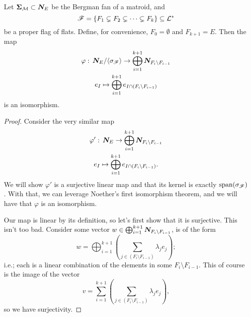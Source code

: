 \documentclass[12pt,oneside]{../../sfsuthesis}
\begin{document}
\begin{proposition}\th\label{thm:quotientBijection}
    Let \( \bm{\Sigma}_{\mathcal{M}} \subset \bm{N}_E \) be the Bergman fan of a matroid, and
    \[
        \mathscr{F} = \{ F_1 \subsetneq F_2 \subsetneq \cdots \subsetneq F_k \} \subseteq \mathcal{L}^\ast
    \]
    be a proper flag of flats.
    Define, for convenience, \( F_0 = \emptyset \) and \( F_{k+1} = E \).
    Then the map
    \begin{gather*}
        \varphi:\, \bm{N}_E/\langle \sigma_{\mathscr{F}} \rangle \to \bigoplus_{i=1}^{k+1} \bm{N}_{F_i \setminus F_{i-1}} \\
        e_I \mapsto \bigoplus_{i=1}^{k+1} e_{I \cap (F_i \setminus F_{i-1})}
    \end{gather*}
    is an isomorphism.
\end{proposition}
\begin{proof}
    Consider the very similar map
    \begin{gather*}
        \varphi':\, \bm{N}_E \to \bigoplus_{i=1}^{k+1} \bm{N}_{F_i \setminus F_{i-1}} \\
        e_I \mapsto \bigoplus_{i=1}^{k+1} e_{I \cap (F_i \setminus F_{i-1})}.
    \end{gather*}
    We will show \( \varphi' \) is a surjective linear map and that its kernel is exactly \( \operatorname{span}(\sigma_{\mathscr{F}})  \).
    With that, we can leverage Noether's first isomorphism theorem, and we will have that \( \varphi \) is an isomorphism.

    Our map is linear by its definition, so let's first show that it is surjective.
    This isn't too bad.
    Consider some vector \( w \in  \bigoplus_{i=1}^{k+1} \bm{N}_{F_i \setminus F_{i-1}}\),
    is of the form
    \[
        w = \bigoplus_{i=1}^{k+1} \left( \sum_{j \in (F_i \setminus F_{i-1} )} \lambda_j e_j \right);
    \]
    i.e.; each is a linear combination of the elements in some \( F_i \setminus F_{i-1} \).
    This of course is the image of the vector
    \[
        v = \sum_{i=1}^{k+1} \left( \sum_{j \in (F_i \setminus F_{i-1} )} \lambda_j e_j \right),
    \]
    so we have surjectivity.


\end{proof}
\end{document}
